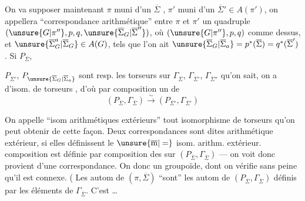 
On va supposer maintenant $\pi$ muni d'un $\overline{\Sigma}$ , $\pi'$ muni d'un $\overline{\Sigma}'\in A(\pi')$, on appellera ``correspondance arithmétique'' entre $\pi$ et $\pi'$ un quadruple $(\unsure{G|\pi''},p,q,\unsure{\overline{\Sigma}_G|\overline{\Sigma}''})$, où $(\unsure{G|\pi''},p,q)$  comme dessus, et $\unsure{\overline{\Sigma}_G^{a}|\overline{\Sigma}_G}\in A(G)$, tels que l'on ait $\unsure{\overline{\Sigma}_G|\overline{\Sigma}_a}=p^*(\overline{\Sigma})=q^*(\overline{\Sigma}')$.  Si $P_{\overline{\Sigma}}$,


$P_{\overline{\Sigma}'}$, $P_{\unsure{\overline{\Sigma}_G|\overline{\Sigma}_a}}$ sont resp. les torseurs sur $\Gamma_{\overline{\Sigma}}$, $\Gamma_{\overline{\Sigma}'}$, $\Gamma_{\overline{\Sigma}''}$ qu'on sait, on a   d'isom. de torseurs
,
d'où par composition un  de
\[
(P_{\overline{\Sigma}},\Gamma_{\overline{\Sigma}})\xrightarrow{\sim}(P_{\overline{\Sigma}'},\Gamma_{\overline{\Sigma}'})
\]

On appelle ``isom arithmétiques extérieurs''  tout isomorphisme de torseurs qu'on peut obtenir de cette façon. Deux correspondances sont dites   arithmétique extérieur, si elles définissent le $\unsure{\overline{\mathrm m}|=}$ isom. arithm. extérieur.  composition est définie par composition des  sur $(P_{\overline{\Sigma}},\Gamma_{\overline{\Sigma}})$ --- on voit donc  provient d'une correspondance. On  donc un groupoïde, dont on vérifie sans peine qu'il est connexe. ( Les autom de $(\pi,\overline{\Sigma})$ ``sont'' les autom de $(P_{\overline{\Sigma}},\Gamma_{\overline{\Sigma}})$ définis par les éléments de $\Gamma_{\overline{\Sigma}}$.  C'est \ldots


